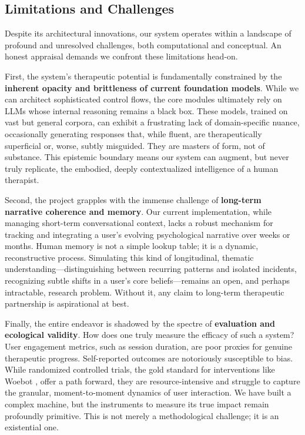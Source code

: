 \subsection{Limitations and Challenges}

Despite its architectural innovations, our system operates within a landscape of profound and unresolved challenges, both computational and conceptual. An honest appraisal demands we confront these limitations head-on.

First, the system's therapeutic potential is fundamentally constrained by the \textbf{inherent opacity and brittleness of current foundation models}. While we can architect sophisticated control flows, the core modules ultimately rely on LLMs whose internal reasoning remains a black box. These models, trained on vast but general corpora, can exhibit a frustrating lack of domain-specific nuance, occasionally generating responses that, while fluent, are therapeutically superficial or, worse, subtly misguided. They are masters of form, not of substance. This epistemic boundary means our system can augment, but never truly replicate, the embodied, deeply contextualized intelligence of a human therapist.

Second, the project grapples with the immense challenge of \textbf{long-term narrative coherence and memory}. Our current implementation, while managing short-term conversational context, lacks a robust mechanism for tracking and integrating a user's evolving psychological narrative over weeks or months. Human memory is not a simple lookup table; it is a dynamic, reconstructive process. Simulating this kind of longitudinal, thematic understanding—distinguishing between recurring patterns and isolated incidents, recognizing subtle shifts in a user's core beliefs—remains an open, and perhaps intractable, research problem. Without it, any claim to long-term therapeutic partnership is aspirational at best.

Finally, the entire endeavor is shadowed by the spectre of \textbf{evaluation and ecological validity}. How does one truly measure the efficacy of such a system? User engagement metrics, such as session duration, are poor proxies for genuine therapeutic progress. Self-reported outcomes are notoriously susceptible to bias. While randomized controlled trials, the gold standard for interventions like Woebot \cite{fitzpatrick2017delivering}, offer a path forward, they are resource-intensive and struggle to capture the granular, moment-to-moment dynamics of user interaction. We have built a complex machine, but the instruments to measure its true impact remain profoundly primitive. This is not merely a methodological challenge; it is an existential one.

